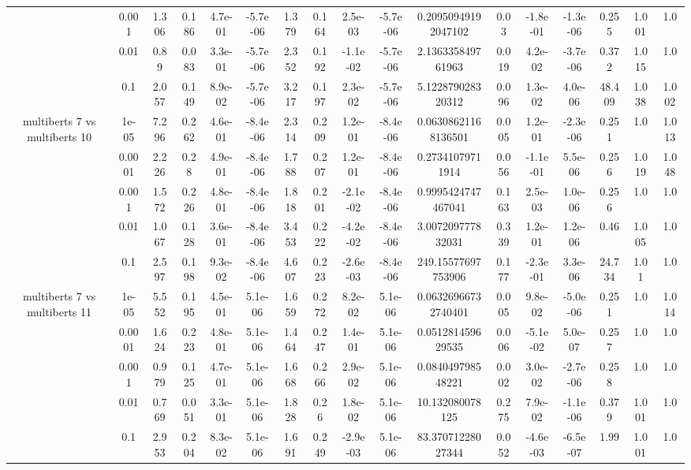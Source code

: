 \begin{tabular}{|c|c|c|c|c|c|c|c|c|c|c|c|c|c|c|c|c|}
 & 0.001 & 1.306 & 0.186 & 4.7e-01 & -5.7e-06 & 1.379 & 0.164 & 2.5e-03 & -5.7e-06 & 0.20950949192047102 & 0.03 & -1.8e-01 & -1.3e-06 & 0.255 & 1.001 & 1.0 \\
 & 0.01 & 0.89 & 0.083 & 3.3e-01 & -5.7e-06 & 2.352 & 0.192 & -1.1e-02 & -5.7e-06 & 2.136335849761963 & 0.019 & 4.2e-02 & -3.7e-06 & 0.372 & 1.015 & 1.0 \\
 & 0.1 & 2.057 & 0.149 & 8.9e-02 & -5.7e-06 & 3.217 & 0.197 & 2.3e-02 & -5.7e-06 & 5.122879028320312 & 0.096 & 1.3e-02 & 4.0e-06 & 48.409 & 1.038 & 1.002 \\
\hline
\multirow{5}{*}{multiberts 7 vs multiberts 10} & 1e-05 & 7.296 & 0.262 & 4.6e-01 & -8.4e-06 & 2.314 & 0.209 & 1.2e-01 & -8.4e-06 & 0.06308621168136501 & 0.005 & 1.2e-01 & -2.3e-06 & 0.251 & 1.0 & 1.013 \\
 & 0.0001 & 2.226 & 0.28 & 4.9e-01 & -8.4e-06 & 1.788 & 0.207 & 1.2e-01 & -8.4e-06 & 0.27341079711914 & 0.056 & -1.1e-01 & 5.5e-06 & 0.256 & 1.019 & 1.048 \\
 & 0.001 & 1.572 & 0.226 & 4.8e-01 & -8.4e-06 & 1.818 & 0.201 & -2.1e-02 & -8.4e-06 & 0.9995424747467041 & 0.163 & 2.5e-03 & 1.0e-06 & 0.256 & 1.0 & 1.0 \\
 & 0.01 & 1.067 & 0.128 & 3.6e-01 & -8.4e-06 & 3.453 & 0.222 & -4.2e-02 & -8.4e-06 & 3.007209777832031 & 0.339 & 1.2e-01 & 1.2e-06 & 0.46 & 1.005 & 1.0 \\
 & 0.1 & 2.597 & 0.198 & 9.3e-02 & -8.4e-06 & 4.607 & 0.223 & -2.6e-03 & -8.4e-06 & 249.15577697753906 & 0.177 & -2.3e-01 & 3.3e-06 & 24.734 & 1.01 & 1.0 \\
\hline
\multirow{5}{*}{multiberts 7 vs multiberts 11} & 1e-05 & 5.552 & 0.195 & 4.5e-01 & 5.1e-06 & 1.659 & 0.272 & 8.2e-02 & 5.1e-06 & 0.06326966732740401 & 0.005 & 9.8e-02 & -5.0e-06 & 0.251 & 1.0 & 1.014 \\
 & 0.0001 & 1.624 & 0.223 & 4.8e-01 & 5.1e-06 & 1.464 & 0.247 & 1.4e-01 & 5.1e-06 & 0.051281459629535 & 0.006 & -5.1e-02 & 5.0e-07 & 0.257 & 1.0 & 1.0 \\
 & 0.001 & 0.979 & 0.125 & 4.7e-01 & 5.1e-06 & 1.668 & 0.266 & 2.9e-02 & 5.1e-06 & 0.084049798548221 & 0.002 & 3.0e-02 & -2.7e-06 & 0.258 & 1.0 & 1.0 \\
 & 0.01 & 0.769 & 0.051 & 3.3e-01 & 5.1e-06 & 1.828 & 0.26 & 1.8e-02 & 5.1e-06 & 10.132080078125 & 0.275 & 7.9e-02 & -1.1e-06 & 0.379 & 1.001 & 1.0 \\
 & 0.1 & 2.953 & 0.204 & 8.3e-02 & 5.1e-06 & 1.691 & 0.249 & -2.9e-03 & 5.1e-06 & 83.37071228027344 & 0.052 & -4.6e-03 & -6.5e-07 & 1.99 & 1.001 & 1.0 \\

\end{tabular}
